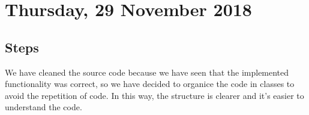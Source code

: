 \section{Thursday, 29 November 2018}

\subsection{Steps}
We have cleaned the source code because we have seen that the implemented functionality was correct, so we have decided to organice the code in classes to avoid the repetition of code. In this way, the structure is clearer and it’s easier to understand the code.
	
